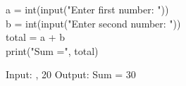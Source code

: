 

\begin{codebox}
\begin{english}
\ttfamily
a = int(input("Enter first number: "))\\
b = int(input("Enter second number: "))\\
total = a + b\\
print("Sum =", total)
\end{english}
\end{codebox}

Input:
\textenglish{, 20}
\qquad
Output:
\textenglish{\ttfamily Sum = 30}




